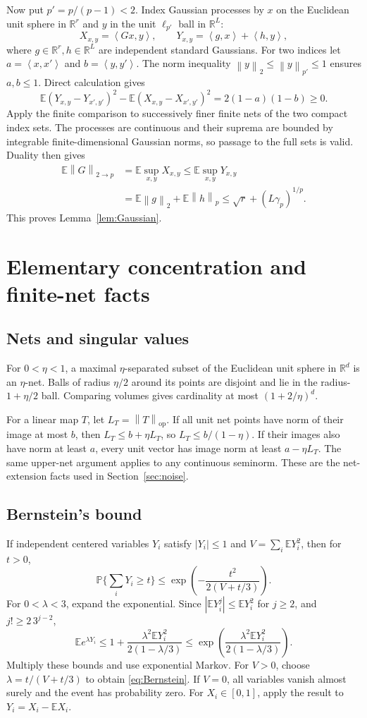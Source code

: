 \documentclass[11pt,letterpaper]{article}
\theoremstyle{definition}
\theoremstyle{remark}
\numberwithin{equation}{section}
\newcommand{\R}{\mathbb R}
\newcommand{\E}{\mathbb E}
\newcommand{\Prob}{\mathbb P}
\newcommand{\norm}[1]{\left\lVert#1\right\rVert}
\newcommand{\ip}[2]{\left\langle#1,#2\right\rangle}
\begin{document}
Now put $p'=p/(p-1)<2$. Index Gaussian processes by $x$ on the Euclidean unit sphere in $\R^r$ and $y$ in the unit $\ell_{p'}$ ball in $\R^L$:
\[
 X_{x,y}=\ip{Gx}{y},\qquad Y_{x,y}=\ip{g}{x}+\ip{h}{y},
\]
where $g\in\R^r,h\in\R^L$ are independent standard Gaussians. For two indices let $a=\ip{x}{x'}$ and $b=\ip{y}{y'}$. The norm inequality $\norm{y}_2\le\norm{y}_{p'}\le1$ ensures $a,b\le1$. Direct calculation gives
\[
 \E(Y_{x,y}-Y_{x',y'})^2-\E(X_{x,y}-X_{x',y'})^2
 =2(1-a)(1-b)\ge0.
\]
Apply the finite comparison to successively finer finite nets of the two compact index sets. The processes are continuous and their suprema are bounded by integrable finite-dimensional Gaussian norms, so passage to the full sets is valid. Duality then gives
\begin{align*}
 \E\norm{G}_{2\to p}
 &=\E\sup_{x,y}X_{x,y}
 \le\E\sup_{x,y}Y_{x,y}\\
 &=\E\norm{g}_2+\E\norm{h}_p
 \le\sqrt r+(L\gamma_p)^{1/p}.
\end{align*}
This proves Lemma~\ref{lem:Gaussian}.

\section{Elementary concentration and finite-net facts}\label{app:prob}
\subsection{Nets and singular values}
For $0<\eta<1$, a maximal $\eta$-separated subset of the Euclidean unit sphere in $\R^d$ is an $\eta$-net. Balls of radius $\eta/2$ around its points are disjoint and lie in the radius-$1+\eta/2$ ball. Comparing volumes gives cardinality at most $(1+2/\eta)^d$.

For a linear map $T$, let $L_T=\norm{T}_{\mathrm{op}}$. If all unit net points have norm of their image at most $b$, then $L_T\le b+\eta L_T$, so $L_T\le b/(1-\eta)$. If their images also have norm at least $a$, every unit vector has image norm at least $a-\eta L_T$. The same upper-net argument applies to any continuous seminorm. These are the net-extension facts used in Section~\ref{sec:noise}.

\subsection{Bernstein's bound}
If independent centered variables $Y_i$ satisfy $|Y_i|\le1$ and $V=\sum_i\E Y_i^2$, then for $t>0$,
\begin{equation}\label{eq:Bernstein}
 \Prob\{\sum_iY_i\ge t\}\le
 \exp\!\left(-\frac{t^2}{2(V+t/3)}\right).
\end{equation}
For $0<\lambda<3$, expand the exponential. Since $|\E Y_i^j|\le\E Y_i^2$ for $j\ge2$, and $j!\ge2\,3^{j-2}$,
\[
 \E e^{\lambda Y_i}\le
 1+\frac{\lambda^2\E Y_i^2}{2(1-\lambda/3)}
 \le\exp\!\left(\frac{\lambda^2\E Y_i^2}{2(1-\lambda/3)}\right).
\]
Multiply these bounds and use exponential Markov. For $V>0$, choose $\lambda=t/(V+t/3)$ to obtain \eqref{eq:Bernstein}. If $V=0$, all variables vanish almost surely and the event has probability zero. For $X_i\in[0,1]$, apply the result to $Y_i=X_i-\E X_i$.
\end{document}
